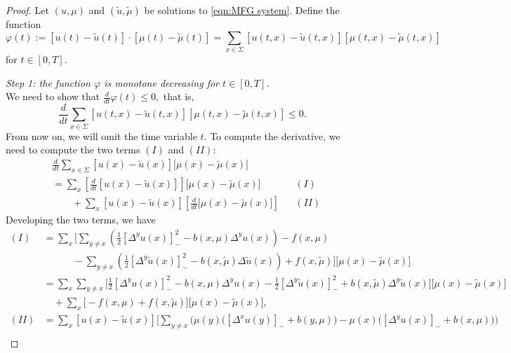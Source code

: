 \documentclass[10pt,a4paper]{amsart}
\begin{document}
\begin{proof}
Let $(u,\mu)$ and $(\tilde{u},\tilde{\mu})$ be solutions to \eqref{eqn:MFG system}.
Define the function 
$$\varphi(t) := [u(t)-\tilde{u}(t)] \cdot [\mu(t)-\tilde{\mu}(t)]
= \sum_{x \in \Sigma} [u(t,x)-\tilde{u}(t,x)][\mu(t,x)-\tilde{\mu}(t,x)]$$ 
for $t \in [0,T]$.

\emph{Step 1: the function $\varphi$ is monotone decreasing for $t \in [0,T]$.}\\
We need to show that
$
\frac{d}{dt} \varphi(t) \le 0,
$
that is,
\begin{equation*}
    \frac{d}{dt} \sum_{x \in \Sigma} [u(t,x)-\tilde{u}(t,x)][\mu(t,x)-\tilde{\mu}(t,x)] \le 0.
\end{equation*}
From now on, we will omit the time variable $t$.
To compute the derivative, we need to compute the two terms $(I)$ and $(II)$:
\begin{align*}
    &\frac{d}{dt} \sum_{x\in\Sigma} [u(x)-\tilde{u}(x)]\big[\mu(x)-\tilde{\mu}(x)\big] \\
    &= \sum_{x} \left[\frac{d}{dt}[u(x)-\tilde{u}(x)]\right]\big[\mu(x)-\tilde{\mu}(x)\big] &&(I)\\
    &\qquad + \sum_{x} [u(x)-\tilde{u}(x)]\left[\frac{d}{dt}\big[\mu(x)-\tilde{\mu}(x)\big]\right] &&(II)
\end{align*}
%
Developing the two terms, we have
\allowdisplaybreaks
\begin{align*}
    (I)
    &= \sum_{x} 
    \Bigg[
    \sum_{y\neq x}
    \left( \frac{1}{2}[\Delta^{y}u(x)]_{-}^2 - b(x,\mu)\Delta^{y}u(x) \right)
    - f(x,\mu) \\
    &\qquad\quad - \sum_{y\neq x} 
    \left( \frac{1}{2}[\Delta^{y}\tilde{u}(x)]_{-}^2 - b(x,\tilde{\mu})\Delta\tilde{u}(x) \right) 
    + f(x,\tilde{\mu}) 
    \Bigg]
    \big[\mu(x)-\tilde{\mu}(x)\big] \\
    &= \sum_{x}\sum_{y \neq x}
    \Bigg[
    \frac{1}{2}[\Delta^{y}u(x)]_{-}^2 - b(x,\mu)\Delta^{y}u(x)
    - \frac{1}{2}[\Delta^{y}\tilde{u}(x)]_{-}^2 + b(x,\tilde{\mu})\Delta^{y}\tilde{u}(x)
    \Bigg] 
    \big[\mu(x)-\tilde{\mu}(x)\big] \\
    &\quad + \sum_{x} \big[-f(x,\mu)+f(x,\tilde{\mu})\big] \big[\mu(x)-\tilde{\mu}(x)\big], \\
    (II)
    &= \sum_{x} [u(x)-\tilde{u}(x)] 
    \Bigg[
    \sum_{y \neq x} \Big( \mu(y)\big([\Delta^{x}u(y)]_{-} + b(y,\mu)\big) 
    - \mu(x)\big([\Delta^{y}u(x)]_{-} + b(x,\mu)\big) \Big) \\

\end{align*}
\end{proof}
\end{document}
